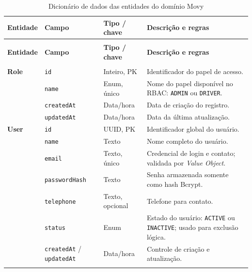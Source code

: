 ﻿%

\newcommand{\ddfield}[1]{{\scriptsize\texttt{#1}}}
\newcommand{\ddentity}[1]{\textbf{#1}}

{\footnotesize
\setlength{\tabcolsep}{3pt}
\renewcommand{\arraystretch}{1.18}
\begin{longtable}{@{}>{\raggedright\arraybackslash}p{2.85cm}
                  >{\raggedright\arraybackslash}p{3.15cm}
                  >{\raggedright\arraybackslash}p{2.9cm}
                  >{\raggedright\arraybackslash}p{6.05cm}@{}}
\caption{Dicionário de dados das entidades do domínio Movy}
\label{tab:dicionario_dados}\\
\toprule
\textbf{Entidade} & \textbf{Campo} & \textbf{Tipo / chave} & \textbf{Descrição e regras} \\
\midrule
\endfirsthead
\multicolumn{4}{l}{\footnotesize\itshape Tabela~\ref{tab:dicionario_dados} -- continuação}\\
\toprule
\textbf{Entidade} & \textbf{Campo} & \textbf{Tipo / chave} & \textbf{Descrição e regras} \\
\midrule
\endhead
\midrule
\multicolumn{4}{r}{\footnotesize\itshape continua na próxima página}\\
\endfoot
\bottomrule
\endlastfoot

\ddentity{Role} & \ddfield{id} & Inteiro, PK & Identificador do papel de acesso. \\
& \ddfield{name} & Enum, único & Nome do papel disponível no RBAC: \texttt{ADMIN} ou \texttt{DRIVER}. \\
& \ddfield{createdAt} & Data/hora & Data de criação do registro. \\
& \ddfield{updatedAt} & Data/hora & Data da última atualização. \\
\addlinespace

\ddentity{User} & \ddfield{id} & UUID, PK & Identificador global do usuário. \\
& \ddfield{name} & Texto & Nome completo do usuário. \\
& \ddfield{email} & Texto, único & Credencial de login e contato; validada por \textit{Value Object}. \\
& \ddfield{passwordHash} & Texto & Senha armazenada somente como hash Bcrypt. \\
& \ddfield{telephone} & Texto, opcional & Telefone para contato. \\
& \ddfield{status} & Enum & Estado do usuário: \texttt{ACTIVE} ou \texttt{INACTIVE}; usado para exclusão lógica. \\
& \ddfield{createdAt} / \ddfield{updatedAt} & Data/hora & Controle de criação e atualização. \\
\addlinespace


\end{longtable}}
